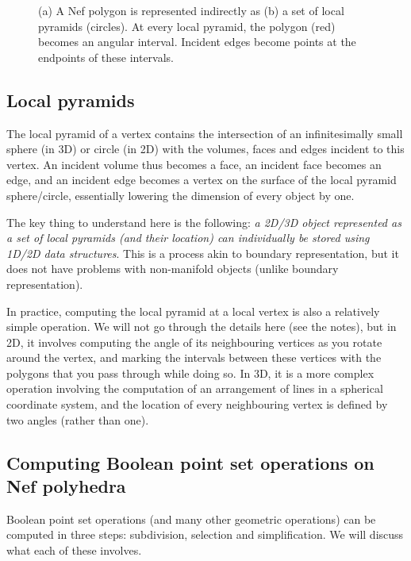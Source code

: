 \begin{figure}
\begin{subfigure}[b]{0.35\linewidth}
\caption{}%
\end{subfigure}
\caption{(a) A Nef polygon is represented indirectly as (b) a set of local pyramids (circles).
At every local pyramid, the polygon (red) becomes an angular interval.
Incident edges become points at the endpoints of these intervals.}%
\label{fig:nef}
\end{figure}

\subsection{Local pyramids}

The local pyramid of a vertex contains the intersection of an infinitesimally small sphere (in 3D) or circle (in 2D) with the volumes, faces and edges incident to this vertex.
An incident volume thus becomes a face, an incident face becomes an edge, and an incident edge becomes a vertex on the surface of the local pyramid sphere/circle, essentially lowering the dimension of every object by one.

The key thing to understand here is the following: \emph{a 2D/3D object represented as a set of local pyramids (and their location) can individually be stored using 1D/2D data structures}.
This is a process akin to boundary representation, but it does not have problems with non-manifold objects (unlike boundary representation).

In practice, computing the local pyramid at a local vertex is also a relatively simple operation.
We will not go through the details here (see the notes), but in 2D, it involves computing the angle of its neighbouring vertices as you rotate around the vertex, and marking the intervals between these vertices with the polygons that you pass through while doing so.
In 3D, it is a more complex operation involving the computation of an arrangement of lines in a spherical coordinate system, and the location of every neighbouring vertex is defined by two angles (rather than one).

\subsection{Computing Boolean point set operations on Nef polyhedra}

Boolean point set operations (and many other geometric operations) can be computed in three steps: subdivision, selection and simplification.
We will discuss what each of these involves.

